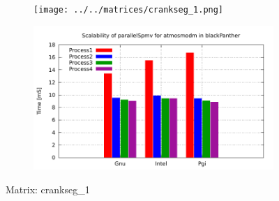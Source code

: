 \begin{figure} [ht!]
    \centering
    \captionsetup{justification=centering, singlelinecheck=false}
    \begin{subfigure}{.65\textwidth}
      \centering
      \hspace*{-3.5cm} 
      \texttt{[image: ../../matrices/crankseg\_1.png]}
      \label{fig:crankseg_1_matrix}
    \end{subfigure}%
    \begin{subfigure}{.65\textwidth}
      \centering
      \hspace*{-6.0cm} 
      \includegraphics[page=2, width=0.95\linewidth]{../plots/blackPanther.pdf}
      \label{fig:crankseg_1_performance}
    \end{subfigure}
\caption{Matrix: crankseg\_1}
\label{fig:crankseg_1}
\end{figure}


